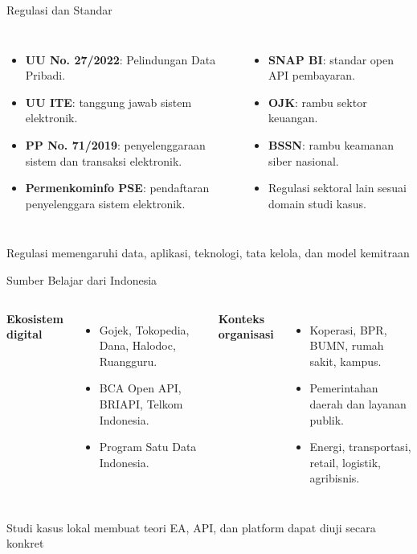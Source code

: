 \documentclass[aspectratio=169, table]{beamer}
\newcommand{\takeaway}[1]{%
  \vspace{4pt}
  {\footnotesize #1}
}
\begin{document}
\begin{frame}{Regulasi dan Standar}
  \vspace{6pt}
  \begin{columns}[t]
    \begin{itemize}
      \item \textbf{UU No. 27/2022}: Pelindungan Data Pribadi.
      \item \textbf{UU ITE}: tanggung jawab sistem elektronik.
      \item \textbf{PP No. 71/2019}: penyelenggaraan sistem dan transaksi elektronik.
      \item \textbf{Permenkominfo PSE}: pendaftaran penyelenggara sistem elektronik.
    \end{itemize}

    \begin{itemize}
      \item \textbf{SNAP BI}: standar open API pembayaran.
      \item \textbf{OJK}: rambu sektor keuangan.
      \item \textbf{BSSN}: rambu keamanan siber nasional.
      \item Regulasi sektoral lain sesuai domain studi kasus.
    \end{itemize}
  \end{columns}

  \takeaway{Regulasi memengaruhi data, aplikasi, teknologi, tata kelola, dan model kemitraan}
\end{frame}

\begin{frame}{Sumber Belajar dari Indonesia}
  \vspace{8pt}
  \begin{columns}[t]
    \textbf{Ekosistem digital}
    \vspace{4pt}
    \begin{itemize}
      \item Gojek, Tokopedia, Dana, Halodoc, Ruangguru.
      \item BCA Open API, BRIAPI, Telkom Indonesia.
      \item Program Satu Data Indonesia.
    \end{itemize}

    \textbf{Konteks organisasi}
    \vspace{4pt}
    \begin{itemize}
      \item Koperasi, BPR, BUMN, rumah sakit, kampus.
      \item Pemerintahan daerah dan layanan publik.
      \item Energi, transportasi, retail, logistik, agribisnis.
    \end{itemize}
  \end{columns}

  \takeaway{Studi kasus lokal membuat teori EA, API, dan platform dapat diuji secara konkret}
\end{frame}
\end{document}
